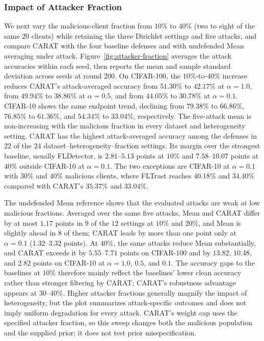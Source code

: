 \subsubsection{Impact of Attacker Fraction}
We next vary the malicious-client fraction from $10\%$ to $40\%$ (two to eight of the same $20$ clients) while retaining the three Dirichlet settings and five attacks, and compare CARAT with the four baseline defenses and with undefended Mean averaging under attack. Figure~\ref{fig:attacker-fraction} averages the attack accuracies within each seed, then reports the mean and sample standard deviation across seeds at round 200. On CIFAR-100, the $10\%$-to-$40\%$ increase reduces CARAT's attack-averaged accuracy from $51.30\%$ to $42.17\%$ at $\alpha=1.0$, from $49.94\%$ to $38.86\%$ at $\alpha=0.5$, and from $44.05\%$ to $30.78\%$ at $\alpha=0.1$. CIFAR-10 shows the same endpoint trend, declining from $79.38\%$ to $66.86\%$, $76.85\%$ to $61.36\%$, and $54.34\%$ to $33.04\%$, respectively. The five-attack mean is non-increasing with the malicious fraction in every dataset and heterogeneity setting. CARAT has the highest attack-averaged accuracy among the defenses in $22$ of the $24$ dataset--heterogeneity--fraction settings. Its margin over the strongest baseline, usually FLDetector, is $2.81$--$5.13$ points at $10\%$ and $7.58$--$10.07$ points at $40\%$ outside CIFAR-10 at $\alpha=0.1$. The two exceptions are CIFAR-10 at $\alpha=0.1$ with $30\%$ and $40\%$ malicious clients, where FLTrust reaches $40.18\%$ and $34.40\%$ compared with CARAT's $35.37\%$ and $33.04\%$.

The undefended Mean reference shows that the evaluated attacks are weak at low malicious fractions. Averaged over the same five attacks, Mean and CARAT differ by at most $1.17$ points in $9$ of the $12$ settings at $10\%$ and $20\%$, and Mean is slightly ahead in $8$ of them; CARAT leads by more than one point only at $\alpha=0.1$ ($1.32$--$3.32$ points). At $40\%$, the same attacks reduce Mean substantially, and CARAT exceeds it by $5.55$--$7.71$ points on CIFAR-100 and by $13.82$, $10.48$, and $2.82$ points on CIFAR-10 at $\alpha=1.0$, $0.5$, and $0.1$. The accuracy gaps to the baselines at $10\%$ therefore mainly reflect the baselines' lower clean accuracy rather than stronger filtering by CARAT; CARAT's robustness advantage appears at $30$--$40\%$. Higher attacker fractions generally magnify the impact of heterogeneity, but the plot summarizes attack-specific outcomes and does not imply uniform degradation for every attack. CARAT's weight cap uses the specified attacker fraction, so this sweep changes both the malicious population and the supplied prior; it does not test prior misspecification.

